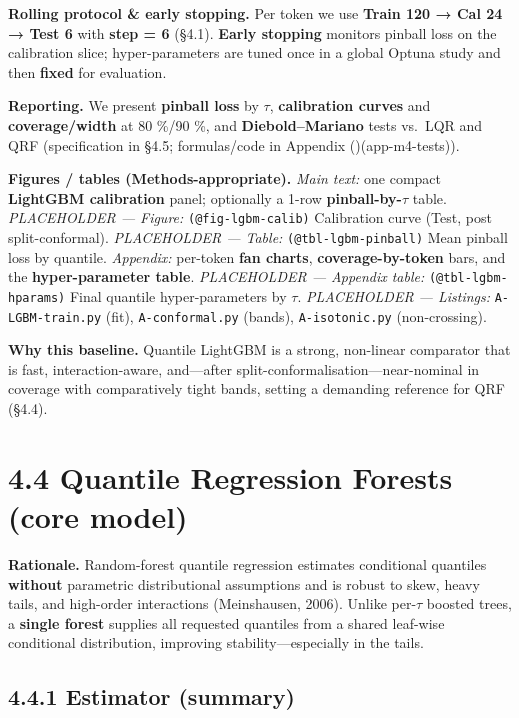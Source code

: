 \documentclass[
  a4paper,
  DIV=11,
  numbers=noendperiod]{scrreprt}
\begin{document}
\textbf{Rolling protocol \& early stopping.} Per token we use
\textbf{Train 120 → Cal 24 → Test 6} with \textbf{step = 6} (§4.1).
\textbf{Early stopping} monitors pinball loss on the calibration slice;
hyper-parameters are tuned once in a global Optuna study and then
\textbf{fixed} for evaluation.

\textbf{Reporting.} We present \textbf{pinball loss} by \(\tau\),
\textbf{calibration curves} and \textbf{coverage/width} at 80 \%/90 \%,
and \textbf{Diebold--Mariano} tests vs.~LQR and QRF (specification in
§4.5; formulas/code in Appendix
()(app-m4-tests)).

\textbf{Figures / tables (Methods-appropriate).} \emph{Main text:} one
compact \textbf{LightGBM calibration} panel; optionally a 1-row
\textbf{pinball-by-\(\tau\)} table. \emph{PLACEHOLDER --- Figure:}
\texttt{(@fig-lgbm-calib)} Calibration curve (Test, post
split-conformal). \emph{PLACEHOLDER --- Table:}
\texttt{(@tbl-lgbm-pinball)} Mean pinball loss by quantile.
\emph{Appendix:} per-token \textbf{fan charts},
\textbf{coverage-by-token} bars, and the \textbf{hyper-parameter table}.
\emph{PLACEHOLDER --- Appendix table:} \texttt{(@tbl-lgbm-hparams)}
Final quantile hyper-parameters by \(\tau\). \emph{PLACEHOLDER ---
Listings:} \texttt{A-LGBM-train.py} (fit), \texttt{A-conformal.py}
(bands), \texttt{A-isotonic.py} (non-crossing).

\textbf{Why this baseline.} Quantile LightGBM is a strong, non-linear
comparator that is fast, interaction-aware, and---after
split-conformalisation---near-nominal in coverage with comparatively
tight bands, setting a demanding reference for QRF (§4.4).

\section{4.4 Quantile Regression Forests (core
model)}\label{quantile-regression-forests-core-model}

\textbf{Rationale.} Random-forest quantile regression estimates
conditional quantiles \textbf{without} parametric distributional
assumptions and is robust to skew, heavy tails, and high-order
interactions (Meinshausen, 2006). Unlike per-\(\tau\) boosted trees, a
\textbf{single forest} supplies all requested quantiles from a shared
leaf-wise conditional distribution, improving stability---especially in
the tails.

\subsection{4.4.1 Estimator (summary)}\label{estimator-summary}
\end{document}
